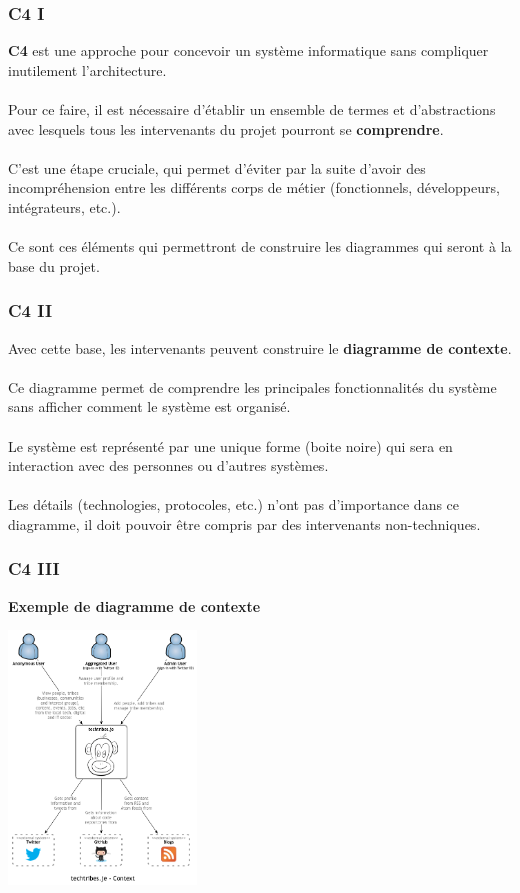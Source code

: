 \begin{frame}
	\frametitle{C4 I}
    
    \textbf{C4} est une approche pour concevoir un syst\`{e}me informatique sans compliquer inutilement l'architecture.
    \\~\\
    Pour ce faire, il est n\'{e}cessaire d'\'{e}tablir un ensemble de termes et d'abstractions avec lesquels tous les intervenants du projet pourront se \textbf{comprendre}.
    \\~\\
    C'est une \'{e}tape cruciale, qui permet d'\'{e}viter par la suite d'avoir des incompr\'{e}hension entre les diff\'{e}rents corps de m\'{e}tier (fonctionnels, d\'{e}veloppeurs, int\'{e}grateurs, etc.).
    \\~\\
    Ce sont ces \'{e}l\'{e}ments qui permettront de construire les diagrammes qui seront \`{a} la base du projet.
\end{frame}

\begin{frame}
	\frametitle{C4 II}
    
    Avec cette base, les intervenants peuvent construire le \textbf{diagramme de contexte}.
    \\~\\
    Ce diagramme permet de comprendre les principales fonctionnalit\'{e}s du syst\`{e}me sans afficher comment le syst\`{e}me est organis\'{e}.
    \\~\\
    Le syst\`{e}me est repr\'{e}sent\'{e} par une unique forme (boite noire) qui sera en interaction avec des personnes ou d'autres syst\`{e}mes.
    \\~\\
    Les d\'{e}tails (technologies, protocoles, etc.) n'ont pas d'importance dans ce diagramme, il doit pouvoir \^{e}tre compris par des intervenants non-techniques.
\end{frame}

\begin{frame}
	\frametitle{C4 III}

    \textbf{Exemple de diagramme de contexte}\\
    \centerline{\includegraphics[width=5cm]{img/context_diagram.png}}
\end{frame}

